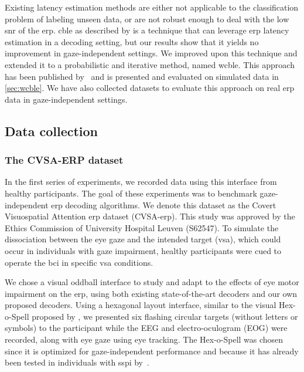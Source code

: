 Existing latency estimation methods are either not applicable to the
classification problem of labeling unseen data, or are not robust enough to
deal with the low \ac{snr} of the \ac{erp}.
\Ac{cble} as described by \textcite{Mowla2017} is a technique that can leverage
\ac{erp} latency estimation in a decoding setting, but our results show that it
yields no improvement in gaze-independent settings.
We improved upon this technique and extended it to a probabilistic and iterative
me\-thod, named \ac{wcble}.
This approach has been published by~\textcite{VanDenKerchove2024} and is presented
and evaluated on simulated data in \cref{sec:wcble}.
We have also collected datasets to evaluate this approach on real \ac{erp} data
in gaze-independent settings.

\subsection{Data collection}

\subsubsection{The CVSA-ERP dataset}
\label{sec:gaze-independence/approach/cvsa-erp}

In the first series of experiments, we recorded data using this interface from healthy participants.
The goal of these experiments was to benchmark
gaze-independent \ac{erp} decoding algorithms.
We denote this dataset as the Covert Visuospatial Attention \ac{erp} dataset
(CVSA-\ac{erp}).
This study was approved by the Ethics Commission of University Hospital Leuven
(S62547).
To simulate the dissociation between the eye gaze and the
intended target (\ac{vsa}), which could occur in individuals with gaze
impairment, healthy participants were cued to operate the \ac{bci} in specific
\ac{vsa} conditions.

We chose a visual oddball interface to study and adapt
to the effects of eye motor impairment on the \ac{erp}, using both existing state-of-the-art
decoders and our own proposed decoders.
Using a hexagonal layout interface, similar to the visual Hex-o-Spell proposed by
\textcite{Treder2010}, we presented six flashing circular targets
(without letters or symbols) to the participant while the EEG and
electro-oculogram (EOG) were recorded, along with eye gaze using eye tracking.
The Hex-o-Spell was chosen since it is optimized for gaze-independent
performance and because it has already been tested in individuals with
\ac{sspi} by~\textcite{Severens2014}.

